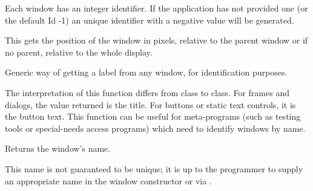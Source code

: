 Each window has an integer identifier. If the application has not provided one
(or the default Id -1) an unique identifier with a negative value will be generated.


\rtfsp
{}



This gets the position of the window in pixels, relative to the parent window or
if no parent, relative to the whole display.







Generic way of getting a label from any window, for
identification purposes.


The interpretation of this function differs from class to class.
For frames and dialogs, the value returned is the title. For buttons or static text controls, it is
the button text. This function can be useful for meta-programs (such as testing
tools or special-needs access programs) which need to identify windows
by name.

\label{wxwindowgetname}


Returns the window's name.


This name is not guaranteed to be unique; it is up to the programmer to supply an appropriate
name in the window constructor or via .

